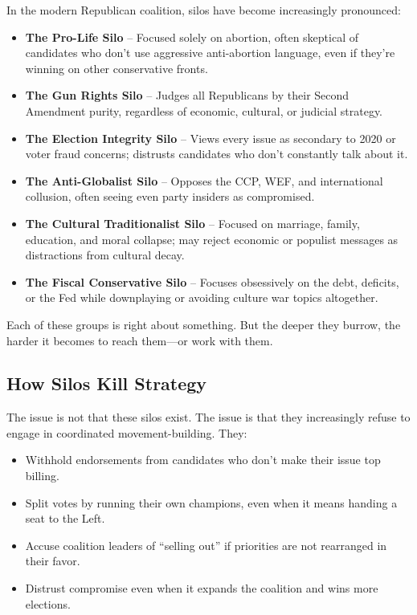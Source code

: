 In the modern Republican coalition, silos have become increasingly pronounced:
\begin{itemize}
    \item \textbf{The Pro-Life Silo} – Focused solely on abortion, often skeptical of candidates who don't use aggressive anti-abortion language, even if they’re winning on other conservative fronts.
    \item \textbf{The Gun Rights Silo} – Judges all Republicans by their Second Amendment purity, regardless of economic, cultural, or judicial strategy.
    \item \textbf{The Election Integrity Silo} – Views every issue as secondary to 2020 or voter fraud concerns; distrusts candidates who don’t constantly talk about it.
    \item \textbf{The Anti-Globalist Silo} – Opposes the CCP, WEF, and international collusion, often seeing even party insiders as compromised.
    \item \textbf{The Cultural Traditionalist Silo} – Focused on marriage, family, education, and moral collapse; may reject economic or populist messages as distractions from cultural decay.
    \item \textbf{The Fiscal Conservative Silo} – Focuses obsessively on the debt, deficits, or the Fed while downplaying or avoiding culture war topics altogether.
\end{itemize}

Each of these groups is right about something. But the deeper they burrow, the harder it becomes to reach them—or work with them.

\subsection*{How Silos Kill Strategy}

The issue is not that these silos exist. The issue is that they increasingly refuse to engage in coordinated movement-building. They:
\begin{itemize}
    \item Withhold endorsements from candidates who don’t make their issue top billing.
    \item Split votes by running their own champions, even when it means handing a seat to the Left.
    \item Accuse coalition leaders of “selling out” if priorities are not rearranged in their favor.
    \item Distrust compromise even when it expands the coalition and wins more elections.
\end{itemize}

